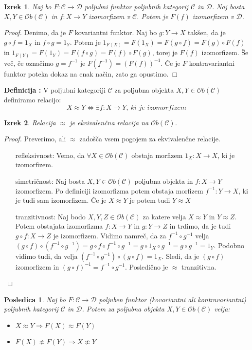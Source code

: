 \documentclass[a4paper, 10pt]{article}
\newtheorem{izr}{Izrek}
\newtheorem{posl}{Posledica}
\newcounter{defcount}
\newenvironment{definicija}{\begin{flushleft}\stepcounter{defcount}\textbf{Definicija \arabic{defcount}:}}{\hfill\end{flushleft}}
\newcommand{\Cc}{\mathcal{C}}
\newcommand{\Dd}{\mathcal{D}}
\newcommand{\Ob}[1]{\mathcal{O}b({#1})}
\newcommand{\map}[3]{\ensuremath{{#1}: {#2} \rightarrow {#3}}}
\begin{document}
	\begin{izr}
		Naj bo $\map{F}{\Cc}{\Dd}$ poljubni funktor poljubnih kategorij $\Cc$ in $\Dd$. Naj bosta $X, Y \in \Ob{\Cc}$ in $\map{f}{X}{Y}$ izomorfizem v $\Cc$. Potem je $F(f)$ izomorfizem v $\Dd$.
	\end{izr}
	\begin{proof}
		Denimo, da je $F$ kovariantni funktor. Naj bo $\map{g}{Y}{X}$ takšen, da je $g\circ f = 1_X$ in $f\circ g = 1_Y$. Potem je $1_{F(X)} = F(1_X) = F(g\circ f) = F(g)\circ F(f)$ in $1_{F(Y)} = F(1_Y) = F(f\circ g) = F(f)\circ F(g)$, torej je $F(f)$ izomorfizem. Še več, če označimo $g = f^{-1}$ je $F(f^{-1}) = (F(f))^{-1}$.
		Če je $F$ kontravariantni funktor poteka dokaz na enak način, zato ga opustimo.
	\end{proof}
	\begin{definicija}
		V poljubni kategoriji $\Cc$ za poljubna objekta $X, Y\in \Ob{\Cc}$ definiramo relacijo: \[
		X \approx Y \iff \exists\map{f}{X}{Y},~\textit{ki je izomorfizem}\]
	\end{definicija}
	\begin{izr}
		Relacija $\approx$ je ekvivalenčna relacija na $\Ob{\Cc}$.
	\end{izr}
	\begin{proof}
		Preverimo, ali $\approx$ zadošča vsem pogojem za ekvivalenčne relacije. \begin{itemize}
			\item[refleksivnost:] Vemo, da $\forall X\in \Ob{\Cc}$ obstaja morfizem $\map{1_X}{X}{X}$, ki je izomorfizem.
			\item[simetričnost:] Naj bosta $X, Y\in \Ob{\Cc}$ poljubna objekta in $\map{f}{X}{Y}$ izomorfizem. Po definiciji izomorfizma potem obstaja morfizem $\map{f^{-1}}{Y}{X}$, ki je tudi sam izomorfizem. Če je $X\approx Y$ je potem tudi $Y\approx X$
			\item[tranzitivnost:] Naj bodo $X, Y, Z\in \Ob{\Cc}$ za katere velja $X\approx Y$ in $Y\approx Z$. Potem obstajata izomorfizma $\map{f}{X}{Y}$ in $\map{g}{Y}{Z}$ in trdimo, da je tudi $\map{g\circ f}{X}{Z}$ je izomorfizem. Vidimo namreč, da za $f^{-1} \circ g^{-1}$ velja $(g\circ f)\circ (f^{-1} \circ g^{-1})= g\circ f\circ f^{-1} \circ g^{-1} = g\circ 1_X \circ g^{-1} = g\circ g^{-1} = 1_Y$. Podobno vidimo tudi, da velja $(f^{-1} \circ g^{-1})\circ (g\circ f) = 1_X$. Sledi, da je $(g\circ f)$ izomorfizem in $(g\circ f)^{-1} = f^{-1} \circ g^{-1}$. Posledično je $\approx$ tranzitivna.
		\end{itemize}
	\end{proof}
	\begin{posl}
		Naj bo $\map{F}{\Cc}{\Dd}$ poljuben funktor (kovariantni ali kontravariantni) poljubnih kategorij $\Cc$ in $\Dd$.
		Potem za poljubna objekta $X, Y\in \Ob{\Cc}$ velja: \begin{itemize}
			\item $X\approx Y \Rightarrow F(X) \approx F(Y)$
			\item $F(X) \not\approx F(Y) \Rightarrow X\not\approx Y$
		\end{itemize}
	\end{posl}
	
\end{document}
